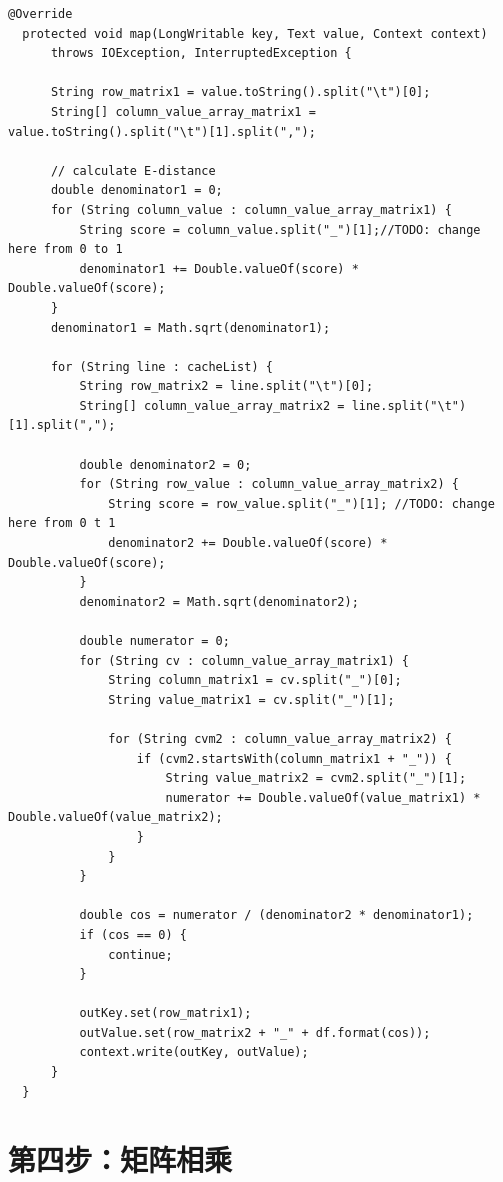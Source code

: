 \documentclass[forprint]{myreport}
\begin{document}
\begin{lstlisting}[style = c]
  @Override
  protected void map(LongWritable key, Text value, Context context) 
      throws IOException, InterruptedException {

      String row_matrix1 = value.toString().split("\t")[0];
      String[] column_value_array_matrix1 = value.toString().split("\t")[1].split(",");

      // calculate E-distance
      double denominator1 = 0;
      for (String column_value : column_value_array_matrix1) {
          String score = column_value.split("_")[1];//TODO: change here from 0 to 1
          denominator1 += Double.valueOf(score) * Double.valueOf(score);
      }
      denominator1 = Math.sqrt(denominator1);

      for (String line : cacheList) {
          String row_matrix2 = line.split("\t")[0];
          String[] column_value_array_matrix2 = line.split("\t")[1].split(",");
          
          double denominator2 = 0;
          for (String row_value : column_value_array_matrix2) {
              String score = row_value.split("_")[1]; //TODO: change here from 0 t 1
              denominator2 += Double.valueOf(score) * Double.valueOf(score);
          }
          denominator2 = Math.sqrt(denominator2);

          double numerator = 0;
          for (String cv : column_value_array_matrix1) {
              String column_matrix1 = cv.split("_")[0];
              String value_matrix1 = cv.split("_")[1];

              for (String cvm2 : column_value_array_matrix2) {
                  if (cvm2.startsWith(column_matrix1 + "_")) {
                      String value_matrix2 = cvm2.split("_")[1];
                      numerator += Double.valueOf(value_matrix1) * Double.valueOf(value_matrix2);
                  }
              }
          }

          double cos = numerator / (denominator2 * denominator1);
          if (cos == 0) {
              continue;
          }
          
          outKey.set(row_matrix1);
          outValue.set(row_matrix2 + "_" + df.format(cos));
          context.write(outKey, outValue);
      }
  }
\end{lstlisting}


\section{第四步：矩阵相乘}\label{sec:s4-matrix-mul}
\end{document}
